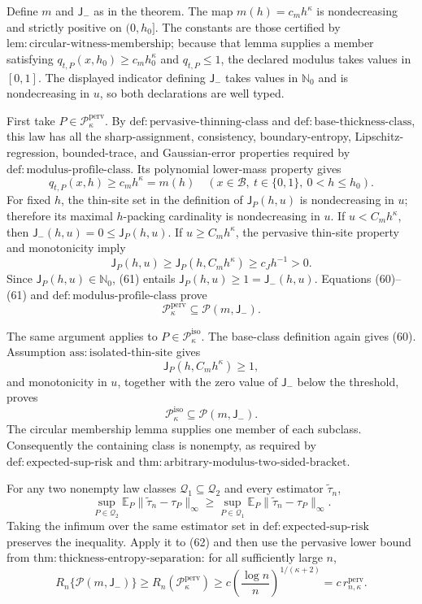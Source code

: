 Define \(m\) and \(\mathsf J_{-}\) as in the theorem.  The map \(m(h)=c_mh^\kappa\) is nondecreasing and strictly positive on \((0,h_0]\).  The constants are those certified by \(\mathrm{lem:circular\text{-}witness\text{-}membership}\); because that lemma supplies a member satisfying \(q_{t,P}(x,h_0)\ge c_mh_0^\kappa\) and \(q_{t,P}\le1\), the declared modulus takes values in \([0,1]\).  The displayed indicator defining \(\mathsf J_{-}\) takes values in \(\mathbb N_0\) and is nondecreasing in \(u\), so both declarations are well typed.

First take \(P\in\mathcal P_{\kappa}^{\mathrm{perv}}\).  By \(\mathrm{def:pervasive\text{-}thinning\text{-}class}\) and \(\mathrm{def:base\text{-}thickness\text{-}class}\), this law has all the sharp-assignment, consistency, boundary-entropy, Lipschitz-regression, bounded-trace, and Gaussian-error properties required by \(\mathrm{def:modulus\text{-}profile\text{-}class}\).  Its polynomial lower-mass property gives
\[
 q_{t,P}(x,h)\ge c_mh^\kappa=m(h)
 \quad
 (x\in\mathcal B,\ t\in\{0,1\},\ 0<h\le h_0). \tag{60}
\]
For fixed \(h\), the thin-site set in the definition of \(\mathsf J_P(h,u)\) is nondecreasing in \(u\); therefore its maximal \(h\)-packing cardinality is nondecreasing in \(u\).  If \(u<C_mh^\kappa\), then \(\mathsf J_{-}(h,u)=0\le\mathsf J_P(h,u)\).  If \(u\ge C_mh^\kappa\), the pervasive thin-site property and monotonicity imply
\[
 \mathsf J_P(h,u)
 \ge\mathsf J_P(h,C_mh^\kappa)
 \ge c_Jh^{-1}>0. \tag{61}
\]
Since \(\mathsf J_P(h,u)\in\mathbb N_0\), (61) entails \(\mathsf J_P(h,u)\ge1=\mathsf J_{-}(h,u)\).  Equations (60)--(61) and \(\mathrm{def:modulus\text{-}profile\text{-}class}\) prove
\[
 \mathcal P_{\kappa}^{\mathrm{perv}}
 \subseteq\mathcal P(m,\mathsf J_{-}). \tag{62}
\]

The same argument applies to \(P\in\mathcal P_{\kappa}^{\mathrm{iso}}\).  The base-class definition again gives (60).  Assumption \(\mathrm{ass:isolated\text{-}thin\text{-}site}\) gives
\[
 \mathsf J_P(h,C_mh^\kappa)\ge1, \tag{63}
\]
and monotonicity in \(u\), together with the zero value of \(\mathsf J_{-}\) below the threshold, proves
\[
 \mathcal P_{\kappa}^{\mathrm{iso}}
 \subseteq\mathcal P(m,\mathsf J_{-}). \tag{64}
\]
The circular membership lemma supplies one member of each subclass.  Consequently the containing class is nonempty, as required by \(\mathrm{def:expected\text{-}sup\text{-}risk}\) and \(\mathrm{thm:arbitrary\text{-}modulus\text{-}two\text{-}sided\text{-}bracket}\).

For any two nonempty law classes \(\mathcal Q_1\subseteq\mathcal Q_2\) and every estimator \(\widetilde\tau_n\),
\[
 \sup_{P\in\mathcal Q_2}
 \mathbb E_P\|\widetilde\tau_n-\tau_P\|_\infty
 \ge
 \sup_{P\in\mathcal Q_1}
 \mathbb E_P\|\widetilde\tau_n-\tau_P\|_\infty.
\]
Taking the infimum over the same estimator set in \(\mathrm{def:expected\text{-}sup\text{-}risk}\) preserves the inequality.  Apply it to (62) and then use the pervasive lower bound from \(\mathrm{thm:thickness\text{-}entropy\text{-}separation}\): for all sufficiently large \(n\),
\[
 R_n\{\mathcal P(m,\mathsf J_{-})\}
 \ge R_n(\mathcal P_{\kappa}^{\mathrm{perv}})
 \ge c\left(\frac{\log n}{n}\right)^{1/(\kappa+2)}
 =c\,r_{n,\kappa}^{\mathrm{perv}}. \tag{65}
\]

